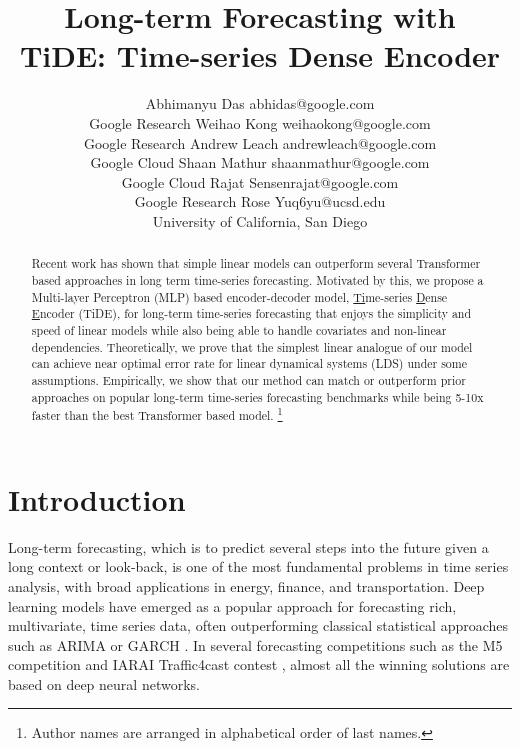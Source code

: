 \documentclass[10pt]{article} \usepackage[accepted]{tmlr}
\title{Long-term Forecasting with \\TiDE: Time-series Dense Encoder}
\author{\name Abhimanyu Das \email abhidas@google.com \\
      \addr Google Research
      \AND
      \name Weihao Kong \email weihaokong@google.com \\
      \addr Google Research
      \AND
      \name Andrew Leach \email andrewleach@google.com \\
      \addr Google Cloud
      \AND
      \name Shaan Mathur \email shaanmathur@google.com \\
      \addr Google Cloud
      \AND
      \name Rajat Sen\email senrajat@google.com \\
      \addr Google Research
      \AND
      \name Rose Yu\email q6yu@ucsd.edu \\
      \addr University of California, San Diego
      }
\theoremstyle{plain}
\theoremstyle{definition}
\theoremstyle{remark}
\newcommand\blfootnote[1]{\begingroup
  \renewcommand\thefootnote{}\footnote{#1}\addtocounter{footnote}{-1}\endgroup
}
\begin{document}
\maketitle

\begin{abstract}
Recent work has shown that simple linear models can outperform several Transformer based approaches in long term time-series forecasting. Motivated by this, we propose a Multi-layer Perceptron (MLP) based encoder-decoder model, \underline{Ti}me-series \underline{D}ense \underline{E}ncoder (TiDE), for long-term time-series forecasting that enjoys the simplicity and speed of linear models while also being able to handle covariates and non-linear dependencies. Theoretically, we prove that the simplest linear analogue of our model can achieve near optimal error rate for linear dynamical systems (LDS) under some assumptions. Empirically, we  show that our method can match or outperform prior approaches on popular long-term time-series forecasting benchmarks while being 5-10x faster than the best Transformer based model.\blfootnote{Author names are arranged in alphabetical order of last names.}
\end{abstract}


\section{Introduction}
Long-term forecasting, which is to predict several steps into the future  given  a long context or look-back, is one of the most fundamental problems in time series analysis, with broad applications in energy, finance, and transportation. Deep learning models \citep{wu2021autoformer,nie2022time} have emerged as a popular approach for forecasting rich, multivariate, time series data, often outperforming classical statistical approaches such as ARIMA or GARCH \citep{box2015time}. In several forecasting competitions such as the M5  competition \citep{makridakis2020m5} and IARAI Traffic4cast contest \citep{kreil2020surprising}, almost all the winning solutions are based on deep neural networks.
\end{document}
